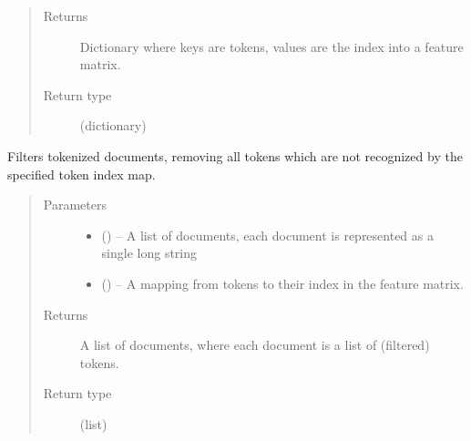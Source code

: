 \documentclass[letterpaper,10pt,english]{sphinxmanual}
\begin{document}
\begin{fulllineitems}
\begin{fulllineitems}
\begin{quote}
\begin{description}
\item[{Returns}] \leavevmode
Dictionary where keys are tokens, values are the index into a feature matrix.

\item[{Return type}] \leavevmode
(dictionary)

\end{description}\end{quote}

\end{fulllineitems}


\begin{fulllineitems}
\label{\detokenize{KUHERD:KUHERD.HerdVectorizer.HerdVectorizer.filter_docs}}
Filters tokenized documents, removing all tokens which are not recognized by the specified token index map.
\begin{quote}\begin{description}
\item[{Parameters}] \leavevmode\begin{itemize}
\item {} 
 () -- A list of documents, each document is represented as a single long string

\item {} 
 () -- A mapping from tokens to their index in the feature matrix.

\end{itemize}

\item[{Returns}] \leavevmode
A list of documents, where each document is a list of (filtered) tokens.

\item[{Return type}] \leavevmode
(list)

\end{description}\end{quote}

\end{fulllineitems}



\end{fulllineitems}
\end{document}
